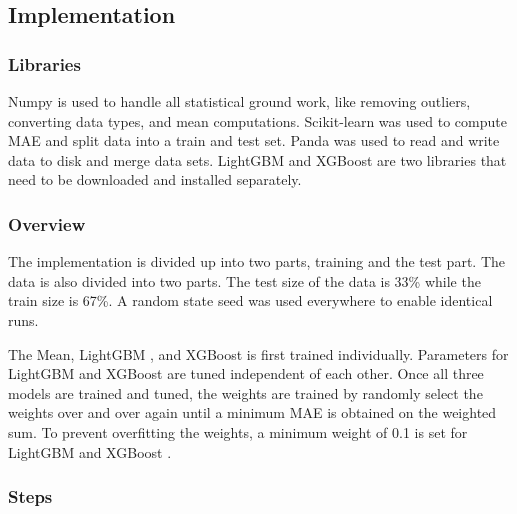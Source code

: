 \documentclass[a4paper]{article}
\begin{document}
\subsection{Implementation}
\subsubsection{Libraries}
Numpy is used to handle all statistical ground work, like removing outliers, converting data types, and mean computations. Scikit-learn was used to compute MAE and split data into a train and test set. Panda was used to read and write data to disk and merge data sets. LightGBM \cite{lightgbm} and XGBoost \cite{xgboost} are two libraries that need to be downloaded and installed separately. 


\subsubsection{Overview}
The implementation is divided up into two parts, training and the test part. The data is also divided into two parts. The test size of the data is 33\% while the train size is 67\%. A random state seed was used everywhere to enable identical runs.

The Mean, LightGBM \cite{lightgbm}, and XGBoost \cite{xgboost} is first trained individually. Parameters for LightGBM \cite{lightgbm} and XGBoost \cite{xgboost} are tuned independent of each other. Once all three models are trained and tuned, the weights are trained by randomly select the weights over and over again until a minimum MAE is obtained on the weighted sum. To prevent overfitting the weights, a minimum weight of 0.1 is set for LightGBM \cite{lightgbm} and XGBoost \cite{xgboost}. 


\subsubsection{Steps}
\end{document}
